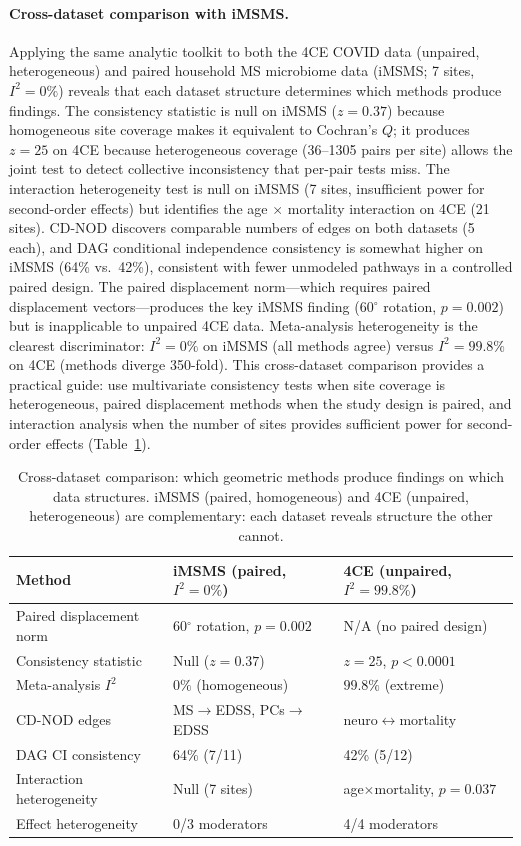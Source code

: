 \documentclass{article}
\begin{document}
\paragraph{Cross-dataset comparison with iMSMS.}
Applying the same analytic toolkit to both the 4CE COVID data (unpaired, heterogeneous) and paired household MS microbiome data (iMSMS; 7 sites, $I^2 = 0\%$) reveals that each dataset structure determines which methods produce findings.
The consistency statistic is null on iMSMS ($z = 0.37$) because homogeneous site coverage makes it equivalent to Cochran's $Q$; it produces $z = 25$ on 4CE because heterogeneous coverage (36--1305 pairs per site) allows the joint test to detect collective inconsistency that per-pair tests miss.
The interaction heterogeneity test is null on iMSMS (7 sites, insufficient power for second-order effects) but identifies the age $\times$ mortality interaction on 4CE (21 sites).
CD-NOD discovers comparable numbers of edges on both datasets (5 each), and DAG conditional independence consistency is somewhat higher on iMSMS (64\% vs.\ 42\%), consistent with fewer unmodeled pathways in a controlled paired design.
The paired displacement norm---which requires paired displacement vectors---produces the key iMSMS finding (60$^{\circ}$ rotation, $p = 0.002$) but is inapplicable to unpaired 4CE data.
Meta-analysis heterogeneity is the clearest discriminator: $I^2 = 0\%$ on iMSMS (all methods agree) versus $I^2 = 99.8\%$ on 4CE (methods diverge 350-fold).
This cross-dataset comparison provides a practical guide: use multivariate consistency tests when site coverage is heterogeneous, paired displacement methods when the study design is paired, and interaction analysis when the number of sites provides sufficient power for second-order effects (Table~\ref{tab:cross_dataset}).

\begin{table}[t]
\centering
\caption{Cross-dataset comparison: which geometric methods produce findings on which data structures. iMSMS (paired, homogeneous) and 4CE (unpaired, heterogeneous) are complementary: each dataset reveals structure the other cannot.}
\label{tab:cross_dataset}
\begin{tabular}{lll}
\toprule
Method & iMSMS (paired, $I^2=0\%$) & 4CE (unpaired, $I^2=99.8\%$) \\
\midrule
Paired displacement norm & 60$^{\circ}$ rotation, $p=0.002$ & N/A (no paired design) \\
Consistency statistic & Null ($z=0.37$) & $z=25$, $p < 0.0001$ \\
Meta-analysis $I^2$ & $0\%$ (homogeneous) & $99.8\%$ (extreme) \\
CD-NOD edges & MS$\to$EDSS, PCs$\to$EDSS & neuro$\leftrightarrow$mortality \\
DAG CI consistency & 64\% (7/11) & 42\% (5/12) \\
Interaction heterogeneity & Null (7 sites) & age$\times$mortality, $p=0.037$ \\
Effect heterogeneity & 0/3 moderators & 4/4 moderators \\
\bottomrule
\end{tabular}
\end{table}
\end{document}
